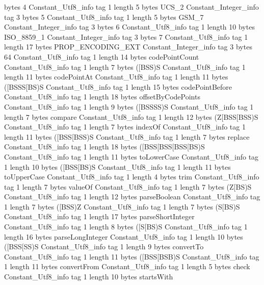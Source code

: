 {{{			bytes	4
		}
		Constant_Utf8_info {
			tag	1
			length	5
			bytes	UCS_2
		}
		Constant_Integer_info {
			tag	3
			bytes	5
		}
		Constant_Utf8_info {
			tag	1
			length	5
			bytes	GSM_7
		}
		Constant_Integer_info {
			tag	3
			bytes	6
		}
		Constant_Utf8_info {
			tag	1
			length	10
			bytes	ISO_8859_1
		}
		Constant_Integer_info {
			tag	3
			bytes	7
		}
		Constant_Utf8_info {
			tag	1
			length	17
			bytes	PROP_ENCODING_EXT
		}
		Constant_Integer_info {
			tag	3
			bytes	64
		}
		Constant_Utf8_info {
			tag	1
			length	14
			bytes	codePointCount
		}
		Constant_Utf8_info {
			tag	1
			length	7
			bytes	([BSS)S
		}
		Constant_Utf8_info {
			tag	1
			length	11
			bytes	codePointAt
		}
		Constant_Utf8_info {
			tag	1
			length	11
			bytes	([BSSS[BS)S
		}
		Constant_Utf8_info {
			tag	1
			length	15
			bytes	codePointBefore
		}
		Constant_Utf8_info {
			tag	1
			length	18
			bytes	offsetByCodePoints
		}
		Constant_Utf8_info {
			tag	1
			length	9
			bytes	([BSSSS)S
		}
		Constant_Utf8_info {
			tag	1
			length	7
			bytes	compare
		}
		Constant_Utf8_info {
			tag	1
			length	12
			bytes	(Z[BSS[BSS)S
		}
		Constant_Utf8_info {
			tag	1
			length	7
			bytes	indexOf
		}
		Constant_Utf8_info {
			tag	1
			length	11
			bytes	([BSS[BSS)S
		}
		Constant_Utf8_info {
			tag	1
			length	7
			bytes	replace
		}
		Constant_Utf8_info {
			tag	1
			length	18
			bytes	([BSS[BSS[BSS[BS)S
		}
		Constant_Utf8_info {
			tag	1
			length	11
			bytes	toLowerCase
		}
		Constant_Utf8_info {
			tag	1
			length	10
			bytes	([BSS[BS)S
		}
		Constant_Utf8_info {
			tag	1
			length	11
			bytes	toUpperCase
		}
		Constant_Utf8_info {
			tag	1
			length	4
			bytes	trim
		}
		Constant_Utf8_info {
			tag	1
			length	7
			bytes	valueOf
		}
		Constant_Utf8_info {
			tag	1
			length	7
			bytes	(Z[BS)S
		}
		Constant_Utf8_info {
			tag	1
			length	12
			bytes	parseBoolean
		}
		Constant_Utf8_info {
			tag	1
			length	7
			bytes	([BSS)Z
		}
		Constant_Utf8_info {
			tag	1
			length	7
			bytes	(S[BS)S
		}
		Constant_Utf8_info {
			tag	1
			length	17
			bytes	parseShortInteger
		}
		Constant_Utf8_info {
			tag	1
			length	8
			bytes	([S[BS)S
		}
		Constant_Utf8_info {
			tag	1
			length	16
			bytes	parseLongInteger
		}
		Constant_Utf8_info {
			tag	1
			length	10
			bytes	([BSS[SS)S
		}
		Constant_Utf8_info {
			tag	1
			length	9
			bytes	convertTo
		}
		Constant_Utf8_info {
			tag	1
			length	11
			bytes	([BSS[BSB)S
		}
		Constant_Utf8_info {
			tag	1
			length	11
			bytes	convertFrom
		}
		Constant_Utf8_info {
			tag	1
			length	5
			bytes	check
		}
		Constant_Utf8_info {
			tag	1
			length	10
			bytes	startsWith
}}}
